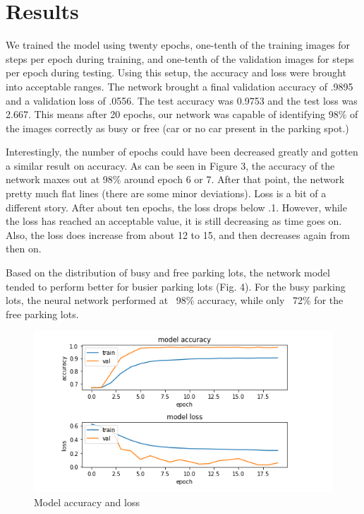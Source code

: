 \documentclass[conference]{IEEEtran}
\begin{document}
\section{Results}

We trained the model using twenty epochs, one-tenth of the training images for steps per epoch during training, and one-tenth of the validation images for steps per epoch during testing. Using this setup, the accuracy and loss were brought into acceptable ranges. The network brought a final validation accuracy of .9895 and a validation loss of .0556. The test accuracy was 0.9753 and the test loss was 2.667. This means after 20 epochs, our network was capable of identifying 98\% of the images correctly as busy or free (car or no car present in the parking spot.)

Interestingly, the number of epochs could have been decreased greatly and gotten a similar result on accuracy. As can be seen in Figure 3, the accuracy of the network maxes out at 98\% around epoch 6 or 7. After that point, the network pretty much flat lines (there are some minor deviations). Loss is a bit of a different story. After about ten epochs, the loss drops below .1. However, while the loss has reached an acceptable value, it is still decreasing as time goes on. Also, the loss does increase from about 12 to 15, and then decreases again from then on. 

Based on the distribution of busy and free parking lots, the network model tended to perform better for busier parking lots (Fig. 4). For the busy parking lots, the neural network performed at ~98\% accuracy, while only ~72\% for the free parking lots.

\begin{figure}[htbp]
\centerline{\includegraphics[scale=0.8]{./Capture.PNG}}
\caption{Model accuracy and loss}
\label{fig}
\end{figure}
\end{document}
